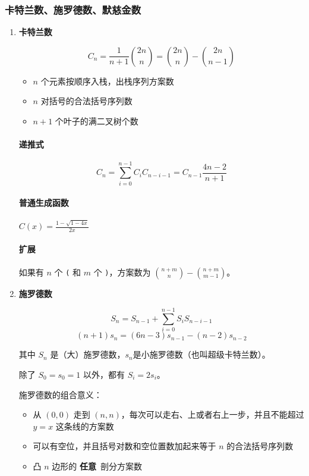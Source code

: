\documentclass[a4paper, twoside]{article}
\begin{document}
    \subsubsection{卡特兰数、施罗德数、默慈金数}
    \begin{enumerate}

        \item \textbf{卡特兰数}
        \label{catalan}
        
        $$C_n = \frac {1}{n + 1}\binom{2n}{n} = \binom{2n}{n} - \binom{2n}{n-1}$$
        
        \begin{itemize}
            \item $n$ 个元素按顺序入栈，出栈序列方案数
            \item $n$ 对括号的合法括号序列数
            \item $n + 1$ 个叶子的满二叉树个数
        \end{itemize}
        
        \paragraph{递推式}
        $$ C_n = \sum_{i = 0} ^ {n - 1} C_i C_{n - i - 1} = C_{n - 1} \frac {4n - 2} {n + 1} $$
        
        \paragraph{普通生成函数} $C(x) = \frac {1 - \sqrt {1 - 4 x}} {2 x}$
        
        \paragraph{扩展} 如果有 $n$ 个 \texttt{(} 和 $m$ 个 \texttt{)}，方案数为 $\binom{n+m}{n} - \binom{n+m}{m-1}$。
        
        \item \textbf{施罗德数}
        
        $$ S_n = S_{n-1} + \sum_{i = 0} ^ {n - 1} S_i S_{n - i - 1} $$
        $$ (n + 1)s_n = (6n - 3)s_{n - 1} - (n - 2) s_{n - 2} $$
        
        其中 $S_n$ 是（大）施罗德数，$s_n$是小施罗德数（也叫超级卡特兰数）。
        
        除了 $S_0 = s_0 = 1$ 以外，都有 $S_i = 2s_i$。
        
        施罗德数的组合意义：
        
        \begin{itemize}
            \item 从 $(0, 0)$ 走到 $(n, n)$，每次可以走右、上或者右上一步，并且不能超过 $y=x$ 这条线的方案数
            \item 可以有空位，并且括号对数和空位置数加起来等于 $n$ 的合法括号序列数
            \item 凸 $n$ 边形的 \textbf{任意}\ 剖分方案数
        \end{itemize}
        

\end{enumerate}
\end{document}
